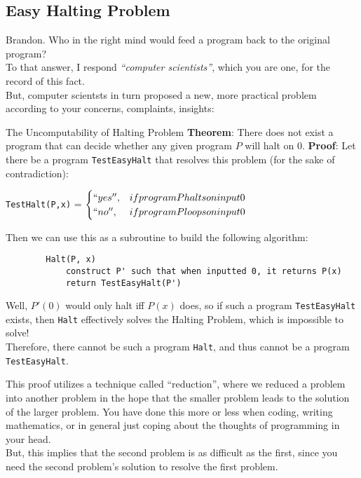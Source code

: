\subsection{Easy Halting Problem}
Brandon. Who in the right mind would feed a program back to the original program? \\
To that answer, I respond \textit{``computer scientists''}, which you are one, for the record of this fact. \\
But, computer scientsts in turn proposed a new, more practical problem according to your concerns, complaints, insights:
\begin{ln-theorem}{The Uncomputability of Halting Problem}{}
    \textbf{Theorem}: There does not exist a program that can decide whether any given program $P$ will halt on $0$.
    \tcblower
    \textbf{Proof}: Let there be a program \verb+TestEasyHalt+ that resolves this problem (for the sake of contradiction):
    \begin{center}
        \verb+TestHalt(P,x)+ = $
        \begin{cases}
            ``yes'', &if program P halts on input 0 \\
            ``no'', &if program P loops on input 0
        \end{cases} $
    \end{center}
    Then we can use this as a subroutine to build the following algorithm:
    \begin{verbatim}
        Halt(P, x)
            construct P' such that when inputted 0, it returns P(x)
            return TestEasyHalt(P')
    \end{verbatim}
    Well, $P'(0)$ would only halt iff $P(x)$ does, so if such a program \verb+TestEasyHalt+ exists, then \verb+Halt+ effectively solves the Halting Problem, which is impossible to solve! \\
    Therefore, there cannot be such a program \verb+Halt+, and thus cannot be a program \verb+TestEasyHalt+.
\end{ln-theorem}
This proof utilizes a technique called ``reduction'', where we reduced a problem into another problem in the hope that the smaller problem leads to the solution of the larger problem. You have done this more or less when coding, writing mathematics, or in general just coping about the thoughts of programming in your head. \\
But, this implies that the second problem is as difficult as the first, since you need the second problem's solution to resolve the first problem.

